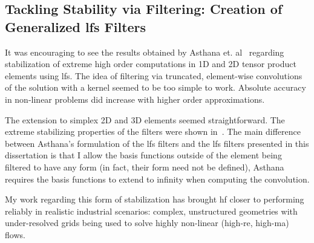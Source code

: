 \subsection{Tackling Stability via Filtering: Creation of Generalized \gls{lfs} Filters}
It was encouraging to see the results obtained by Asthana et. al~\cite{asthana2014} regarding stabilization of extreme high order computations in 1D and 2D tensor product elements using \gls{lfs}. The idea of filtering via truncated, element-wise convolutions of the solution with a kernel seemed to be too simple to work. Absolute accuracy in non-linear problems did increase with higher order approximations.

The extension to simplex 2D and 3D elements seemed straightforward. The extreme stabilizing properties of the filters were shown in~\cite{lopez2015stabilization}. The main difference between Asthana's formulation of the \gls{lfs} filters and the \gls{lfs} filters presented in this dissertation is that I allow the basis functions outside of the element being filtered to have any form (in fact, their form need not be defined), Asthana requires the basis functions to extend to infinity when computing the convolution.

My work regarding this form of stabilization has brought \gls{hf} closer to performing reliably in realistic industrial scenarios: complex, unstructured geometries with under-resolved grids being used to solve highly non-linear (high-\gls{re}, high-\gls{ma}) flows.





